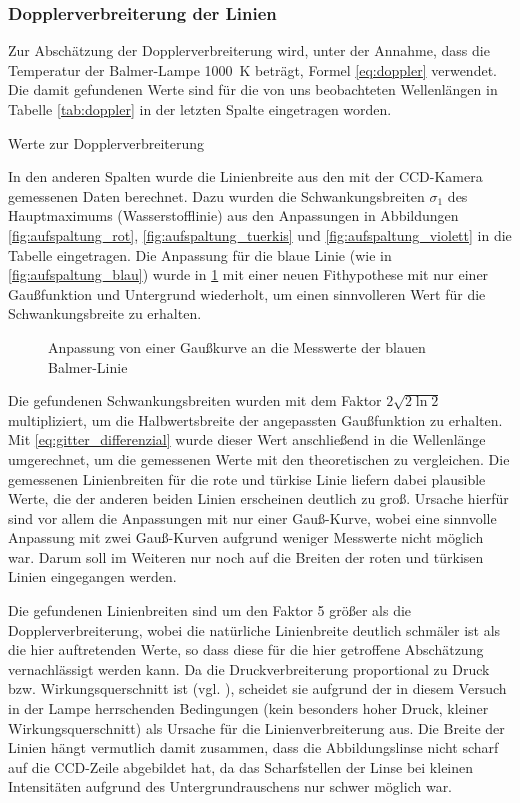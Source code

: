 \documentclass[11pt, a4paper]{article}
\numberwithin{equation}{section}
\begin{document}
\subsubsection{Dopplerverbreiterung der Linien}
Zur Abschätzung der Dopplerverbreiterung wird, unter der Annahme, dass die Temperatur der Balmer-Lampe \SI{1000}{\kelvin} beträgt, Formel \eqref{eq:doppler} verwendet.
Die damit gefundenen Werte sind für die von uns beobachteten Wellenlängen in Tabelle \ref{tab:doppler} in der letzten Spalte eingetragen worden.
\begin{table}[h]
\centering
\resizebox{\columnwidth}{!}{%
}
\caption{Werte zur Dopplerverbreiterung}
\label{tab:doppler}
\end{table}
In den anderen Spalten wurde die Linienbreite aus den mit der CCD-Kamera gemessenen Daten berechnet.
Dazu wurden die Schwankungsbreiten $\sigma_1$ des Hauptmaximums (Wasserstofflinie) aus den Anpassungen in Abbildungen \ref{fig:aufspaltung_rot}, \ref{fig:aufspaltung_tuerkis} und \ref{fig:aufspaltung_violett} in die Tabelle eingetragen.
Die Anpassung für die blaue Linie (wie in \ref{fig:aufspaltung_blau}) wurde in \ref{fig:doppler_blau} mit einer neuen Fithypothese mit nur einer Gaußfunktion und Untergrund wiederholt, um einen sinnvolleren Wert für die Schwankungsbreite zu erhalten.
\begin{figure}[h]
\centering

\caption{Anpassung von einer Gaußkurve an die Messwerte der blauen Balmer-Linie}
\label{fig:doppler_blau}
\end{figure}
Die gefundenen Schwankungsbreiten wurden mit dem Faktor $2\sqrt{2\ln2}$ multipliziert, um die Halbwertsbreite der angepassten Gaußfunktion zu erhalten.
Mit \eqref{eq:gitter_differenzial} wurde dieser Wert anschließend in die Wellenlänge umgerechnet, um die gemessenen Werte mit den theoretischen zu vergleichen.
Die gemessenen Linienbreiten für die rote und türkise Linie liefern dabei plausible Werte, die der anderen beiden Linien erscheinen deutlich zu groß.
Ursache hierfür sind vor allem die Anpassungen mit nur einer Gauß-Kurve, wobei eine sinnvolle Anpassung mit zwei Gauß-Kurven aufgrund weniger Messwerte nicht möglich war.
Darum soll im Weiteren nur noch auf die Breiten der roten und türkisen Linien eingegangen werden.

Die gefundenen Linienbreiten sind um den Faktor \num{5} größer als die Dopplerverbreiterung, wobei die natürliche Linienbreite deutlich schmäler ist als die hier auftretenden Werte, so dass diese für die hier getroffene Abschätzung vernachlässigt werden kann.
Da die Druckverbreiterung proportional zu Druck bzw. Wirkungsquerschnitt ist (vgl. \cite{gerthsen}), scheidet sie aufgrund der in diesem Versuch in der Lampe herrschenden Bedingungen (kein besonders hoher Druck, kleiner Wirkungsquerschnitt) als Ursache für die Linienverbreiterung aus.
Die Breite der Linien hängt vermutlich damit zusammen, dass die Abbildungslinse nicht scharf auf die CCD-Zeile abgebildet hat, da das Scharfstellen der Linse bei kleinen Intensitäten aufgrund des Untergrundrauschens nur schwer möglich war.
\end{document}
